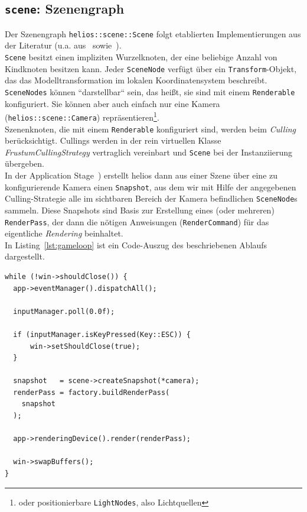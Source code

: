\subsection*{\texttt{scene}: Szenengraph}
Der Szenengraph \texttt{helios::scene::Scene} folgt etablierten Implementierungen aus der Literatur  (u.a. aus~\cite[]{She07} sowie~\cite[]{Gre19}).\\
\texttt{Scene} besitzt einen impliziten Wurzelknoten, der eine beliebige Anzahl von Kindknoten besitzen kann.
Jeder \texttt{SceneNode} verfügt über ein \texttt{Transform}-Objekt, das das Modelltransformation im lokalen Koordinatensystem beschreibt.\\
\texttt{SceneNodes} können ``darstellbar`` sein, das heißt, sie sind mit einem \texttt{Renderable} konfiguriert.
Sie können aber auch einfach nur eine Kamera (\texttt{helios::scene::Camera}) repräsentieren\footnote{oder positionierbare \texttt{LightNodes}, also Lichtquellen}.\\
Szenenknoten, die mit einem \texttt{Renderable} konfiguriert sind, werden beim \textit{Culling} berücksichtigt.
Cullings werden in der rein virtuellen Klasse \textit{FrustumCullingStrategy} vertraglich vereinbart und \texttt{Scene} bei der Instanziierung übergeben.\\
In der Application Stage~\cite[687]{Gre19}) erstellt helios dann aus einer Szene über eine zu konfigurierende Kamera einen \texttt{Snapshot}, aus dem wir mit Hilfe der angegebenen Culling-Strategie alle im sichtbaren Bereich der Kamera befindlichen \texttt{SceneNode}s sammeln.
Diese Snapshots sind Basis zur Erstellung eines (oder mehreren) \texttt{RenderPass}, der dann die nötigen Anweisungen (\texttt{RenderCommand}) für das eigentliche \textit{Rendering} beinhaltet.\\
In Listing~\ref{lst:gameloop} ist ein Code-Auszug des beschriebenen Ablaufs dargestellt.

\vspace{4mm}
\begin{lstlisting}[style=c++style, caption={Implementierung einer einfachen Game Loop in helios.}, label=lst:gameloop]
while (!win->shouldClose()) {
  app->eventManager().dispatchAll();

  inputManager.poll(0.0f);

  if (inputManager.isKeyPressed(Key::ESC)) {
      win->setShouldClose(true);
  }

  snapshot   = scene->createSnapshot(*camera);
  renderPass = factory.buildRenderPass(
    snapshot
  );

  app->renderingDevice().render(renderPass);

  win->swapBuffers();
}
\end{lstlisting}
\vspace{4mm}


